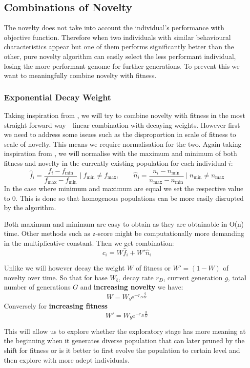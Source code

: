 \subsection{Combinations of Novelty}
\label{sec:combFitNov}
The novelty does not take into account the individual's performance with objective function. Therefore when two individuals with similar behavioural characteristics appear but one of them performs significantly better than the other, pure novelty algorithm can easily select the less performant individual, losing the more performant genome for further generations. To prevent this we want to meaningfully combine novelty with fitness.\\
\subsubsection{Exponential Decay Weight}
Taking inspiration from \cite{notenoughnovelty}, we will try to combine novelty with fitness in the most straight-forward way - linear combination with decaying weights.
However first we need to address some issues such as the disproportion in scale of fitness to scale of novelty. This means we require normalisation for the two. Again taking inspiration from \cite{notenoughnovelty}, we will normalise with the maximum and minimum of both fitness and novelty in the currently existing population for each individual $ i $: 
$$
\hat{f}_{i} =
	\frac{f_i-f_{\min}}{f_{\max}-f_{\min}} \mid f_{\min} \neq f_{\max}
,  
\qquad
\hat{n}_{i}=\frac{n_i-n_{\min}}
	{n_{\max}-n_{\min}} \mid n_{\min} \neq n_{\max}
$$
In the case where minimum and maximum are equal we set the respective value to 0. This is done so that homogenous populations can be more easily disrupted by the algorithm.


Both maximum and minimum are easy to obtain as they are obtainable in O(n) time. Other methods such as z-score might be computationally more demanding in the multiplicative constant.
Then we get combination:
$$ c_i = W\hat{f}_{i} + W'\hat{n}_{i} $$


Unlike \cite{notenoughnovelty} we will however decay the weight $ W $ of fitness or $ W' = (1-W) $ of novelty over time.
So that for base $ W_b $, decay rate $ r_D $, current generation $ g $, total number of generations $ G $  and \textbf{increasing novelty} we have: 
$$ W = W_b e^{-r_D\frac{g}{G}} $$
Conversely for \textbf{increasing fitness}
$$ W' = W_b e^{-r_D\frac{g}{G}} $$

This will allow us to explore whether the exploratory stage has more meaning at the beginning when it generates diverse population that can later pruned by the shift for fitness or is it better to first evolve the population to certain level and then explore with more adept individuals.


